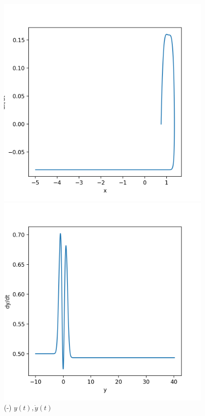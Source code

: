 \documentclass[a4paper,12pt]{article}
\begin{document}
\begin{figure}[H]
	\centering
	\begin{minipage}{0.5\textwidth}
		\centering
		\includegraphics[width=0.95\textwidth]{./phase-og-1signed.png}
		\caption{ (-) $x(t), \dot{x}(t)$ }
	\end{minipage}\hfill
	\begin{minipage}{0.5\textwidth}
		\centering
		\includegraphics[width=0.95\textwidth]{./phase-og-2signed.png}
		\caption{ (-) $y(t), \dot{y}(t)$ }
	\end{minipage}
\end{figure}
\end{document}
